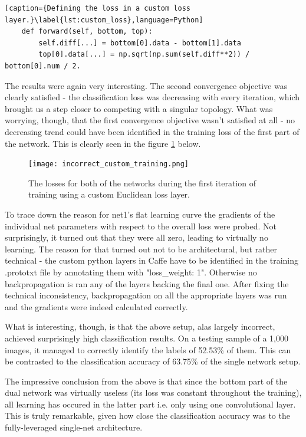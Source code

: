 \documentclass[a4paper, 12pt]{article}
\numberwithin{equation}{section}
\begin{document}
	\begin{lstlisting}[caption={Defining the loss in a custom loss layer.}\label{lst:custom_loss},language=Python]
	def forward(self, bottom, top):
	    self.diff[...] = bottom[0].data - bottom[1].data
	    top[0].data[...] = np.sqrt(np.sum(self.diff**2)) / bottom[0].num / 2.
	\end{lstlisting}
	
	The results were again very interesting. The second convergence objective was clearly satisfied - the classification loss was decreasing with every iteration, which brought us a step closer to competing with a singular topology. What was worrying, though, that the first convergence objective wasn't satisfied at all - no decreasing trend could have been identified in the training loss of the first part of the network. This is clearly seen in the figure \ref{fig:incorrect_custom_training} below.
	
	\begin{figure}[!h]
		\centering
		\texttt{[image: incorrect\_custom\_training.png]}
		\caption{\label{fig:incorrect_custom_training}{The losses for both of the networks during the first iteration of training using a custom Euclidean loss layer.}}
	\end{figure}

	To trace down the reason for net1's flat learning curve the gradients of the individual net parameters with respect to the overall loss were probed. Not surprisingly, it turned out that they were all zero, leading to virtually no learning. The reason for that turned out not to be architectural, but rather technical - the custom python layers in Caffe have to be identified in the training .prototxt file by annotating them with "loss\_weight: 1". Otherwise no backpropagation is ran any of the layers backing the final one. After fixing the technical inconsistency, backpropagation on all the appropriate layers was run and the gradients were indeed calculated correctly.
	
	What is interesting, though, is that the above setup, alas largely incorrect, achieved surprisingly high classification results. On a testing sample of a 1,000 images, it managed to correctly identify the labels of 52.53\% of them. This can be contrasted to the classification accuracy of 63.75\% of the single network setup.
	
	The impressive conclusion from the above is that since the bottom part of the dual network was virtually useless (its loss was constant throughout the training), all learning has occured in the latter part i.e. only using one convolutional layer. This is truly remarkable, given how close the classification accuracy was to the fully-leveraged single-net architecture.
	
\end{document}
